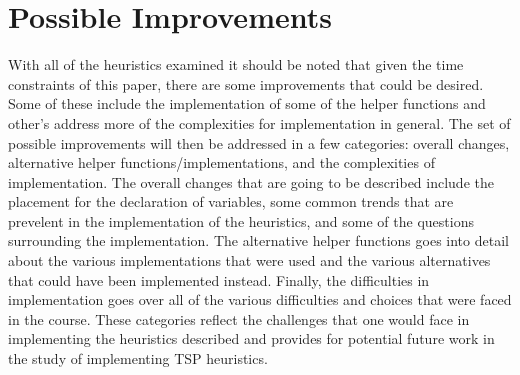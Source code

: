 \documentclass[midd]{thesis}
\newcommand{\tab}{\hspace*{2em}}
\begin{document}
\chapter{Possible Improvements}
\tab With all of the heuristics examined it should be noted that given the time constraints of this paper, there are some improvements that could be desired. Some of these include the implementation of some of the helper functions and other's address more of the complexities for implementation in general. The set of possible improvements will then be addressed in a few categories: overall changes, alternative helper functions/implementations, and the complexities of implementation. The overall changes that are going to be described include the placement for the declaration of variables, some common trends that are prevelent in the implementation of the heuristics, and some of the questions surrounding the implementation. The alternative helper functions goes into detail about the various implementations that were used and the various alternatives that could have been implemented instead. Finally, the difficulties in implementation goes over all of the various difficulties and choices that were faced in the course. These categories reflect the challenges that one would face in implementing the heuristics described and provides for potential future work in the study of implementing TSP heuristics.\\
\end{document}
